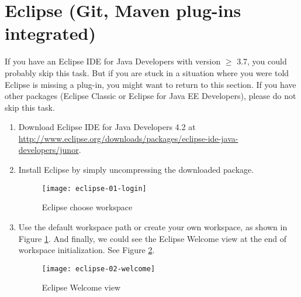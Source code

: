 
\section{Eclipse (Git, Maven plug-ins integrated)}

If you have an Eclipse IDE for Java Developers with version $\ge$ 3.7, you could
probably skip this task. But if you are stuck in a situation where you were told
Eclipse is missing a plug-in, you might want to return to this section. If you
have other packages (Eclipse Classic or Eclipse for Java EE Developers), please
do not skip this task.

\begin{enumerate}

\item Download Eclipse IDE for Java Developers 4.2 at
\url{http://www.eclipse.org/downloads/packages/eclipse-ide-java-developers/junor}.


\item Install Eclipse by simply uncompressing the downloaded package.

\begin{figure}[t]
\centering
\texttt{[image: eclipse-01-login]}
\caption{Eclipse choose workspace\label{eclipse-01-login}}
\end{figure}

\item Use the default workspace path or create your own workspace, as shown in
Figure \ref{eclipse-01-login}. And finally, we could see the Eclipse Welcome
view at the end of workspace initialization. See Figure
\ref{eclipse-02-welcome}.

\begin{figure}[t]
\centering
\texttt{[image: eclipse-02-welcome]}
\caption{Eclipse Welcome view\label{eclipse-02-welcome}}
\end{figure}

\end{enumerate}
